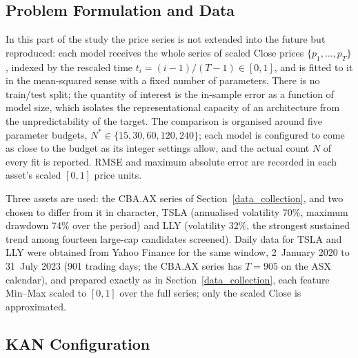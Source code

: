 %
{\JOY
\subsection{Problem Formulation and Data}
\label{approx_problem}

In this part of the study the price series is not extended into the
future but reproduced: each model receives the whole series of scaled
Close prices \(\{p_1,\ldots,p_T\}\), indexed by the rescaled time
\(t_i=(i-1)/(T-1)\in[0,1]\), and is fitted to it in the mean-squared
sense with a fixed number of parameters. There is no train/test split;
the quantity of interest is the in-sample error as a function of model
size, which isolates the representational capacity of an architecture
from the unpredictability of the target. The comparison is organised
around five parameter budgets, \(N^{*}\in\{15,30,60,120,240\}\); each
model is configured to come as close to the budget as its integer
settings allow, and the actual count \(N\) of every fit is reported.
RMSE and maximum absolute error are recorded in each asset's scaled
\([0,1]\) price units.

Three assets are used: the CBA.AX series of
Section~\ref{data_collection}, and two chosen to differ from it in
character, TSLA (annualised volatility 70\%, maximum drawdown 74\% over
the period) and LLY (volatility 32\%, the strongest sustained trend among
fourteen large-cap candidates screened). Daily data for TSLA and LLY
were obtained from Yahoo Finance for the same window, 2~January 2020 to
31~July 2023 (901 trading days; the CBA.AX series has \(T=905\) on the
ASX calendar), and prepared exactly as in
Section~\ref{data_collection}, each feature Min--Max scaled to \([0,1]\)
over the full series; only the scaled Close is approximated.

\subsection{KAN Configuration}
\label{approx_kan}

}
